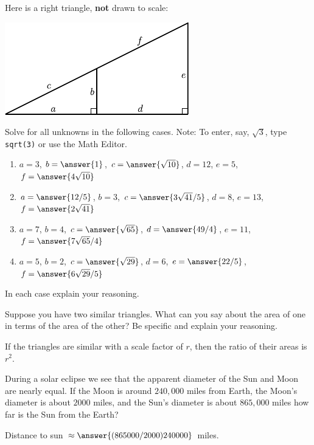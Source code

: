 \documentclass[nooutcomes]{ximera}
\begin{document}
\begin{question}
Here is a right triangle, \textbf{not} drawn to scale:
\begin{image}
\includegraphics{origamiSimQ.pdf}
\end{image}
Solve for all unknowns in the following cases.  Note:  To enter, say, $\sqrt{3}$, type \texttt{sqrt(3)} or use the Math Editor. 
\begin{enumerate}
\item $a = 3$, $b = \answer{1}$, $c = \answer{\sqrt{10}}$, $d = 12$, $e = 5$, $f = \answer{4 \sqrt{10}}$
\item $a = \answer{12/5}$, $b = 3$, $c = \answer{3\sqrt{41}/5}$, $d =8$, $e = 13$, $f = \answer{2\sqrt{41}}$
\item $a = 7$, $b = 4$, $c = \answer{\sqrt{65}}$, $d =\answer{49/4}$, $e = 11$, $f = \answer{7\sqrt{65}/4}$
\item $a = 5$, $b = 2$, $c = \answer{\sqrt{29}}$, $d =6$, $e = \answer{22/5}$, $f = \answer{6\sqrt{29}/5}$
\end{enumerate}
In each case explain your reasoning.
\end{question}

\begin{question}
Suppose you have two similar triangles. What can you say about
  the area of one in terms of the area of the other? Be specific and
  explain your reasoning.
\begin{freeResponse}
\begin{hint}
If the triangles are similar with a scale factor of $r$, then the ratio of their areas is $r^2$. 
\end{hint}
\end{freeResponse}
\end{question}

\begin{question}
During a solar eclipse we see that the apparent diameter of the
  Sun and Moon are nearly equal. If the Moon is around $240,000$ miles
  from Earth, the Moon's diameter is about $2000$ miles, and the Sun's
  diameter is about $865,000$ miles how far is the Sun from the Earth?

Distance to sun $\approx \answer{(865000/2000)240000}$ miles. 
\end{question}
\end{document}
